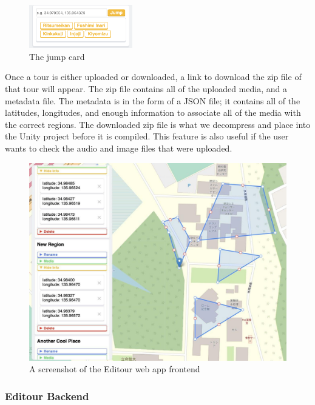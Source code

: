 \documentclass[a4paper, 10pt, american, titlepage]{article}
\begin{document}
\begin{figure}[h]
	\centering
    \includegraphics[width=0.4\textwidth]{jump-card-editour.png}
    \caption{The jump card}
	\label{fig:jumpCard}
\end{figure}

Once a tour is either uploaded or downloaded, a link to download the zip file of
that tour will appear. The zip file contains all of the uploaded media, and a
metadata file. The metadata is in the form of a JSON file; it contains all of
the latitudes, longitudes, and enough information to associate all of the media
with the correct regions. The downloaded zip file is what we decompress and
place into the Unity project before it is compiled. This feature is also useful
if the user wants to check the audio and image files that were uploaded.

\begin{figure}[h]
	\centering
	\includegraphics[width=\textwidth]{editour.jpg}
	\caption{A screenshot of the Editour web app frontend}
	\label{fig:editour}
\end{figure}

\subsubsection{Editour Backend}
\label{sec:editourBackend}
\end{document}
